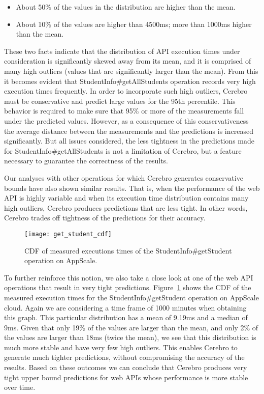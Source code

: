 \begin{itemize}
\item About 50\% of the values in the distribution are higher than the mean.
\item About 10\% of the values are higher than 4500ms; more than 1000ms higher than the mean.
\end{itemize}

These two facts indicate that the distribution of API execution times under consideration is significantly skewed away from its 
mean, and it is comprised of many high outliers (values that are significantly larger than the mean).
From this it becomes evident that StudentInfo\#getAllStudents operation records very high execution times frequently. 
In order to incorporate such high outliers, Cerebro must be conservative and predict large values for
the 95th percentile. This behavior is required to make sure that 95\% or more of the measurements fall under the
predicted values. However, as a consequence of this conservativeness the average distance between the measurements and 
the predictions is increased significantly. But all issues considered, the less tightness in the predictions made for StudentInfo\#getAllStudents
is not a limitation of Cerebro, but a feature necessary to guarantee the correctness of the results.

Our analyses with other operations for which
Cerebro generates conservative bounds have also shown similar results. That is, when the performance of the web API is highly variable and
when its execution time distribution contains
many high outliers, Cerebro produces predictions that are less tight. In other words, Cerebro trades off tightness of the predictions 
for their accuracy.

\begin{figure}
\centering
\texttt{[image: get\_student\_cdf]}
\caption{CDF of measured executions times of the StudentInfo\#getStudent operation on AppScale.}
\label{fig:get_student_cdf}
\end{figure}

To further reinforce this notion, we also take a close look at one of the web API operations that result in very tight predictions. 
Figure~\ref{fig:get_student_cdf} shows the CDF of the measured execution times for the StudentInfo\#getStudent operation on
AppScale cloud. Again we are considering a time frame of 1000 minutes when obtaining this graph.
This particular distribution has a mean of 9.19ms and a median of 9ms. Given that only 19\% of the values are larger than the mean, 
and only 2\% of the values are larger than 18ms (twice the mean), 
we see that this distribution is much more stable and have very few high outliers. This enables Cerebro to generate much
tighter predictions, without compromising the accuracy of the results. Based on these outcomes we can conclude that Cerebro produces
very tight upper bound predictions for web APIs whose performance is more stable over time. %

